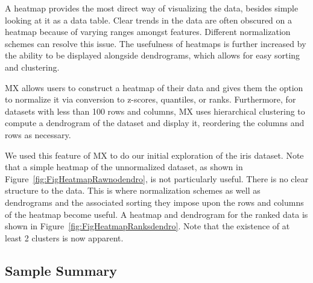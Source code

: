 \documentclass[twoside,leqno,twocolumn]{article}
\begin{document}
A heatmap provides the most direct way of visualizing the data, besides simple looking at it as a data table. Clear trends in the data are often obscured on a heatmap because of varying ranges amongst features. Different normalization schemes can resolve this issue. The usefulness of heatmaps is further increased by the ability to be displayed alongside dendrograms, which allows for easy sorting and clustering.

MX allows users to construct a heatmap of their data and gives them the option to normalize it via conversion to z-scores, quantiles, or ranks. Furthermore, for datasets with less than 100 rows and columns, MX uses hierarchical clustering to compute a dendrogram of the dataset and display it, reordering the columns and rows as necessary. 

We used this feature of MX to do our initial exploration of the iris dataset. Note that a simple heatmap of the unnormalized dataset, as shown in Figure~\ref{fig:FigHeatmapRawnodendro}, is not particularly useful. There is no clear structure to the data. This is where normalization schemes as well as dendrograms and the associated sorting they impose upon the rows and columns of the heatmap become useful. A heatmap and dendrogram for the ranked data is shown in Figure~\ref{fig:FigHeatmapRanksdendro}. Note that the existence of at least 2 clusters is now apparent.

\subsection{Sample Summary}
\label{subsec:SubSecSample}
\end{document}

